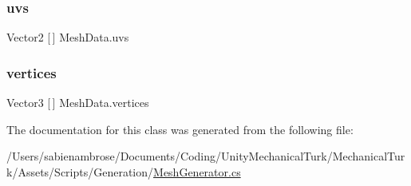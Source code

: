 \subsubsection{\texorpdfstring{uvs}{uvs}}
{\footnotesize\ttfamily Vector2 \mbox{[}$\,$\mbox{]} Mesh\+Data.\+uvs}

\mbox{\label{class_mesh_data_ae3f35f48b31703208a848cf265daa11b}} 
\subsubsection{\texorpdfstring{vertices}{vertices}}
{\footnotesize\ttfamily Vector3 \mbox{[}$\,$\mbox{]} Mesh\+Data.\+vertices}



The documentation for this class was generated from the following file\+:\begin{DoxyCompactItemize}
\item 
/\+Users/sabienambrose/\+Documents/\+Coding/\+Unity\+Mechanical\+Turk/\+Mechanical\+Turk/\+Assets/\+Scripts/\+Generation/\mbox{\hyperlink{_mesh_generator_8cs}{Mesh\+Generator.\+cs}}\end{DoxyCompactItemize}
